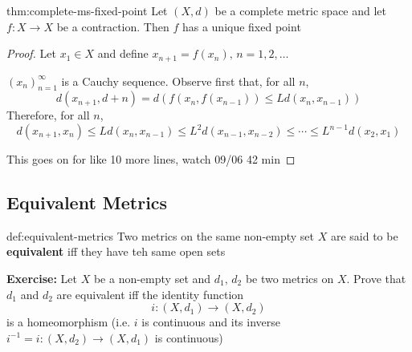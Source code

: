 \documentclass{article}
\begin{document}
\begin{thm}{thm:complete-ms-fixed-point}{}
    Let $(X, d)$ be a complete metric space and let $f : X \to X$ be a contraction. Then $f$ has a unique fixed point
\end{thm}

\begin{proof}
    Let $x_{1}\in X$ and define $x_{n+1} = f(x_{n}),\, n = 1,2,\dots$

    $(x_{n})^{\infty}_{n = 1}$ is a Cauchy sequence. Observe first that, for all $n$,
    \[d(x_{n+1}, d+n) = d(f(x_{n}, f(x_{n-1})) \le L d(x_{n}, x_{n-1}))\]
    Therefore, for all $n$,
    \[d(x_{n+1}, x_{n}) \le Ld(x_{n}, x_{n-1})\le L^{2}d(x_{n-1},x_{n-2}) \le \cdots \le L^{n-1}d(x_{2}, x_{1})\]

    This goes on for like 10 more lines, watch 09/06 42 min
\end{proof}

\subsection{Equivalent Metrics}
\begin{dfn}{def:equivalent-metrics}{}
    Two metrics on the same non-empty set $X$ are said to be \textbf{equivalent} iff they have teh same open sets
\end{dfn}

\textbf{Exercise:} Let $X$ be a non-empty set and $d_{1},\,d_{2}$ be two metrics on $X$. Prove that $d_{1}$ and $d_{2}$ are equivalent iff the identity function
\[i : (X, d_{1}) \to (X, d_{2})\]
is a homeomorphism (i.e. $i$ is continuous and its inverse $i^{-1} = i : (X, d_{2})\to (X, d_{1})$ is continuous)
\end{document}
